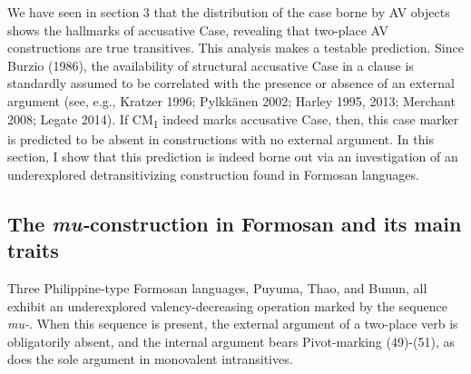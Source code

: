 \documentclass[10pt]{article}
\begin{document}
\noindent We have seen in section 3 that the distribution of the case borne by AV objects shows the hallmarks of accusative Case, revealing that two-place AV constructions are true transitives. This analysis makes a testable prediction. Since Burzio (1986), the availability of structural accusative Case in a clause is standardly assumed to be correlated with the presence or absence of an external argument (see, e.g., Kratzer 1996; Pylkkänen 2002; Harley 1995, 2013; Merchant 2008; Legate 2014). If CM\textsubscript{1} indeed marks accusative Case, then, this case marker is predicted to be absent in constructions with no external argument. In this section, I show that this prediction is indeed borne out via an investigation of an underexplored detransitivizing construction found in Formosan languages.

\subsection{The \textit{mu-}construction in Formosan and its main traits}

\noindent Three Philippine-type Formosan languages, Puyuma, Thao, and Bunun, all exhibit an underexplored valency-decreasing operation marked by the sequence \textit{mu-}. When this sequence is present, the external argument of a two-place verb is obligatorily absent, and the internal argument bears Pivot-marking (49)-(51), as does the sole argument in monovalent intransitives.
\end{document}
